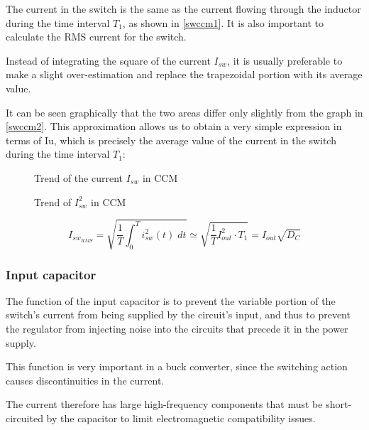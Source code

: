 \documentclass[../main.tex]{subfiles}
\begin{document}
The current in the switch is the same as the current flowing through the inductor during the time interval $T_1$, as shown in \autoref{swccm1}. It is also important to calculate the RMS current for the switch. 

Instead of integrating the square of the current $I_{sw}$, it is usually preferable to make a slight over-estimation and replace the trapezoidal portion with its average value. 

It can be seen graphically that the two areas differ only slightly from the graph in \autoref{swccm2}. This approximation allows us to obtain a very simple expression in terms of Iu, which is precisely the average value of the current in the switch during the time interval $T_1$:




\begin{figure}[h!]
\begin{center}


\label{swccm1}
\caption{Trend of the current $I_{sw}$ in CCM}	
\end{center}
\end{figure}

\begin{figure}[h!]
\begin{center}


\label{swccm2}
\caption{Trend of $I^2_{sw}$ in CCM}	
\end{center}
\end{figure}


\begin{equation}
	I_{sw_{RMS}} = \sqrt{\frac{1}{T} \int_0^T i^2_{sw} (t)\; dt } \simeq \sqrt{\frac{1}{T} I^2_{out} \cdot T_1} = I_{out} \sqrt{D_C}
\end{equation}


\subsubsection*{Input capacitor}

The function of the input capacitor is to prevent the variable portion of the switch’s current from being supplied by the circuit’s input, and thus to prevent the regulator from injecting noise into the circuits that precede it in the power supply. 

This function is very important in a buck converter, since the switching action causes discontinuities in the current. 

The current therefore has large high-frequency components that must be short-circuited by the capacitor to limit electromagnetic compatibility issues.
\end{document}
